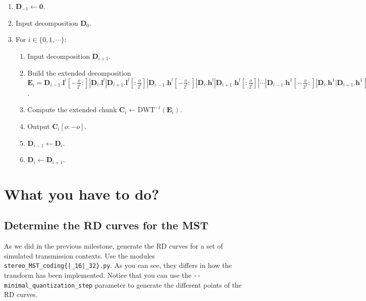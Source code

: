 \begin{enumerate}
\item ${\mathbf D}_{-1}\leftarrow{\mathbf 0}$.
\item Input decomposition ${\mathbf D}_0$.
\item For $i\in\{0,1,\cdots\}$:
  \begin{enumerate}
  \item Input decomposition ${\mathbf D}_{i+1}$.
  \item Build the extended decomposition ${\mathbf E}_i =
    {\mathbf D}_{i-1}.{\mathbf l}^l[-\frac{o}{2^l}:]|{\mathbf D}_i.{\mathbf l}^l|{\mathbf D}_{i+1}.{\mathbf l}^l[:\frac{o}{2^l}]|{\mathbf D}_{i-1}.{\mathbf h}^l[-\frac{o}{2^l}:]|{\mathbf D}_i.{\mathbf h}^l|{\mathbf D}_{i+1}.{\mathbf h}^l[:\frac{o}{2^l}]|\cdots|{\mathbf D}_{i-1}.{\mathbf h}^1[-\frac{o}{2^1}:]|{\mathbf D}_i.{\mathbf h}^1|{\mathbf D}_{i+1}.{\mathbf h}^1[:\frac{o}{2^1}]$.
  \item Compute the extended chunk ${\mathbf C}_i\leftarrow\text{DWT}^{-l}({\mathbf E}_i)$.
  \item Output ${\mathbf C}_i[o:-o]$.
  \item ${\mathbf D}_{i-1} \leftarrow {\mathbf D}_i$.
  \item ${\mathbf D}_i \leftarrow {\mathbf D}_{i+1}$.
  \end{enumerate}
\end{enumerate}





\section{What you have to do?}

\subsection{Determine the RD curves for the MST}
As we did in the previous milestone, generate the RD curves for a set
of simulated transmission contexts. Use the modules
\texttt{stereo\_MST\_coding\{|\_16|\_32\}.py}. As you can see, they
differs in how the transform has been implemented.  Notice that you
can use the \verb|--minimal_quantization_step| parameter to generate
the different points of the RD curves.

